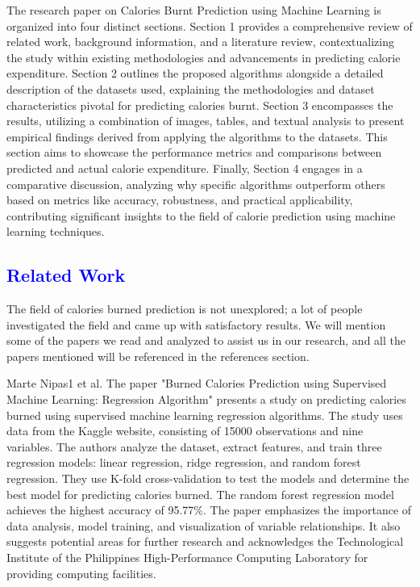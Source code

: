 \documentclass[conference]{IEEEtran}
\newcommand{\mar}[1]{\textcolor{blue}{#1}}
\begin{document}
The research paper on Calories Burnt Prediction using Machine Learning is organized into four distinct sections. Section 1 provides a comprehensive review of related work, background information, and a literature review, contextualizing the study within existing methodologies and advancements in predicting calorie expenditure. Section 2 outlines the proposed algorithms alongside a detailed description of the datasets used, explaining the methodologies and dataset characteristics pivotal for predicting calories burnt. Section 3 encompasses the results, utilizing a combination of images, tables, and textual analysis to present empirical findings derived from applying the algorithms to the datasets. This section aims to showcase the performance metrics and comparisons between predicted and actual calorie expenditure. Finally, Section 4 engages in a comparative discussion, analyzing why specific algorithms outperform others based on metrics like accuracy, robustness, and practical applicability, contributing significant insights to the field of calorie prediction using machine learning techniques.  \newline


 \mar{\section{\textbf{\large Related Work}}}
\label{Related}
The field of calories burned prediction is not unexplored; a lot of people investigated the field and came up with satisfactory results. We will mention some of the papers we read and analyzed to assist us in our research, and all the papers mentioned will be referenced in the references section.
\newline

\newline
Marte Nipas1 et al.\textcolor{blue}{\citep{MarteNipas1}}
The paper "Burned Calories Prediction using Supervised Machine Learning: Regression Algorithm" presents a study on predicting calories burned using supervised machine learning regression algorithms. The study uses data from the Kaggle website, consisting of 15000 observations and nine variables. The authors analyze the dataset, extract features, and train three regression models: linear regression, ridge regression, and random forest regression. They use K-fold cross-validation to test the models and determine the best model for predicting calories burned. The random forest regression model achieves the highest accuracy of 95.77\%. The paper emphasizes the importance of data analysis, model training, and visualization of variable relationships. It also suggests potential areas for further research and acknowledges the Technological Institute of the Philippines High-Performance Computing Laboratory for providing computing facilities.
\newline
\end{document}
